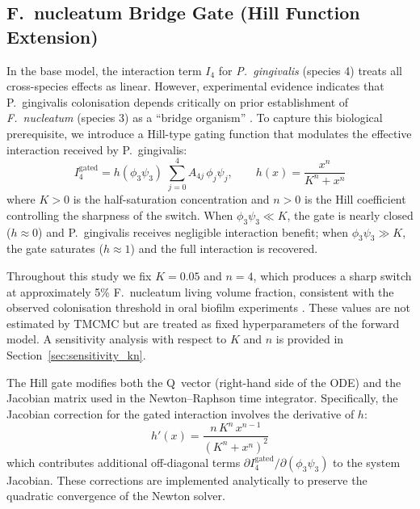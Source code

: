 \documentclass[11pt,a4paper]{article}
\begin{document}
\subsection{F.~nucleatum Bridge Gate (Hill Function Extension)}
\label{sec:hill_gate}

In the base model, the interaction term $I_4$ for \textit{P.~gingivalis} (species 4) treats all cross-species effects as linear. However, experimental evidence indicates that P.~gingivalis colonisation depends critically on prior establishment of \textit{F.~nucleatum} (species 3) as a ``bridge organism'' \cite{Kolenbrander2010OralMultispecies, Soleimani2023CoAggregation, Mukherjee2025PgTitanium}. To capture this biological prerequisite, we introduce a Hill-type gating function that modulates the effective interaction received by P.~gingivalis:
\begin{equation}
  I_4^{\mathrm{gated}} = h(\phi_3 \psi_3)\;\sum_{j=0}^{4} A_{4j}\,\phi_j\psi_j, \qquad
  h(x) = \frac{x^n}{K^n + x^n}
  \label{eq:hill_gate}
\end{equation}
where $K > 0$ is the half-saturation concentration and $n > 0$ is the Hill coefficient controlling the sharpness of the switch. When $\phi_3\psi_3 \ll K$, the gate is nearly closed ($h \approx 0$) and P.~gingivalis receives negligible interaction benefit; when $\phi_3\psi_3 \gg K$, the gate saturates ($h \approx 1$) and the full interaction is recovered.

Throughout this study we fix $K = 0.05$ and $n = 4$, which produces a sharp switch at approximately 5\% F.~nucleatum living volume fraction, consistent with the observed colonisation threshold in oral biofilm experiments \cite{Heine2025PeriImplant}. These values are not estimated by TMCMC but are treated as fixed hyperparameters of the forward model. A sensitivity analysis with respect to $K$ and $n$ is provided in Section~\ref{sec:sensitivity_kn}.

The Hill gate modifies both the Q~vector (right-hand side of the ODE) and the Jacobian matrix used in the Newton--Raphson time integrator. Specifically, the Jacobian correction for the gated interaction involves the derivative of $h$:
\begin{equation}
  h'(x) = \frac{n\,K^n\,x^{n-1}}{(K^n + x^n)^2}
  \label{eq:hill_deriv}
\end{equation}
which contributes additional off-diagonal terms $\partial I_4^{\mathrm{gated}}/\partial(\phi_3\psi_3)$ to the system Jacobian. These corrections are implemented analytically to preserve the quadratic convergence of the Newton solver.
\end{document}
